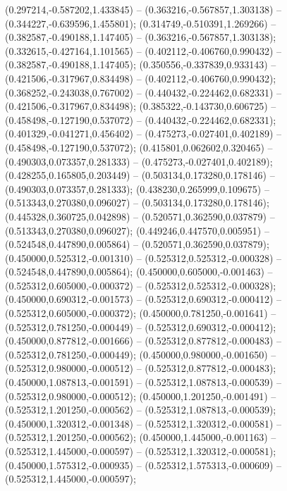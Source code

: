  (0.297214,-0.587202,1.433845) -- (0.363216,-0.567857,1.303138) -- (0.344227,-0.639596,1.455801);
 (0.314749,-0.510391,1.269266) -- (0.382587,-0.490188,1.147405) -- (0.363216,-0.567857,1.303138);
 (0.332615,-0.427164,1.101565) -- (0.402112,-0.406760,0.990432) -- (0.382587,-0.490188,1.147405);
 (0.350556,-0.337839,0.933143) -- (0.421506,-0.317967,0.834498) -- (0.402112,-0.406760,0.990432);
 (0.368252,-0.243038,0.767002) -- (0.440432,-0.224462,0.682331) -- (0.421506,-0.317967,0.834498);
 (0.385322,-0.143730,0.606725) -- (0.458498,-0.127190,0.537072) -- (0.440432,-0.224462,0.682331);
 (0.401329,-0.041271,0.456402) -- (0.475273,-0.027401,0.402189) -- (0.458498,-0.127190,0.537072);
 (0.415801,0.062602,0.320465) -- (0.490303,0.073357,0.281333) -- (0.475273,-0.027401,0.402189);
 (0.428255,0.165805,0.203449) -- (0.503134,0.173280,0.178146) -- (0.490303,0.073357,0.281333);
 (0.438230,0.265999,0.109675) -- (0.513343,0.270380,0.096027) -- (0.503134,0.173280,0.178146);
 (0.445328,0.360725,0.042898) -- (0.520571,0.362590,0.037879) -- (0.513343,0.270380,0.096027);
 (0.449246,0.447570,0.005951) -- (0.524548,0.447890,0.005864) -- (0.520571,0.362590,0.037879);
 (0.450000,0.525312,-0.001310) -- (0.525312,0.525312,-0.000328) -- (0.524548,0.447890,0.005864);
 (0.450000,0.605000,-0.001463) -- (0.525312,0.605000,-0.000372) -- (0.525312,0.525312,-0.000328);
 (0.450000,0.690312,-0.001573) -- (0.525312,0.690312,-0.000412) -- (0.525312,0.605000,-0.000372);
 (0.450000,0.781250,-0.001641) -- (0.525312,0.781250,-0.000449) -- (0.525312,0.690312,-0.000412);
 (0.450000,0.877812,-0.001666) -- (0.525312,0.877812,-0.000483) -- (0.525312,0.781250,-0.000449);
 (0.450000,0.980000,-0.001650) -- (0.525312,0.980000,-0.000512) -- (0.525312,0.877812,-0.000483);
 (0.450000,1.087813,-0.001591) -- (0.525312,1.087813,-0.000539) -- (0.525312,0.980000,-0.000512);
 (0.450000,1.201250,-0.001491) -- (0.525312,1.201250,-0.000562) -- (0.525312,1.087813,-0.000539);
 (0.450000,1.320312,-0.001348) -- (0.525312,1.320312,-0.000581) -- (0.525312,1.201250,-0.000562);
 (0.450000,1.445000,-0.001163) -- (0.525312,1.445000,-0.000597) -- (0.525312,1.320312,-0.000581);
 (0.450000,1.575312,-0.000935) -- (0.525312,1.575313,-0.000609) -- (0.525312,1.445000,-0.000597);
